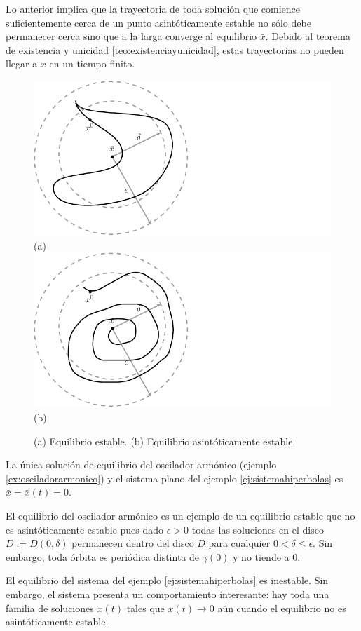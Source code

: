 Lo anterior implica que la trayectoria de toda solución que comience suficientemente cerca de un punto asintóticamente estable no sólo debe permanecer cerca sino que a la larga converge al equilibrio $\bar{x}$. Debido al teorema de existencia y unicidad \ref{teo:existenciayunicidad}, estas trayectorias no pueden llegar a $\bar{x}$ en un tiempo finito.

\begin{figure}[!ht] \centering
	\includegraphics[scale=1.0]{figures/equilibrium-stable.pdf}\\(a) \\
	\includegraphics[scale=1.0]{figures/equilibrium-asymptoticallystable.pdf}\\(b) \\
	\caption{(a) Equilibrio estable. (b) Equilibrio asintóticamente estable.}
\end{figure}

\begin{example}
La única solución de equilibrio del oscilador armónico (ejemplo \ref{ex:osciladorarmonico}) y el sistema plano del ejemplo \ref{ej:sistemahiperbolas} es $\bar{x} = \bar{x}(t) = 0$.

El equilibrio del oscilador armónico es un ejemplo de un equilibrio estable que no es asintóticamente estable pues dado $\epsilon > 0$ todas las soluciones en el disco $D := D(0, \delta)$ permanecen dentro del disco $D$ para cualquier $0 < \delta \leq \epsilon$. Sin embargo, toda órbita es periódica distinta de $\gamma(0)$ y no tiende a $0$.

El equilibrio del sistema del ejemplo \ref{ej:sistemahiperbolas} es inestable. Sin embargo, el sistema presenta un comportamiento interesante: hay toda una familia de soluciones $x(t)$ tales que $x(t) \to 0$ aún cuando el equilibrio no es asintóticamente estable.

\end{example}


